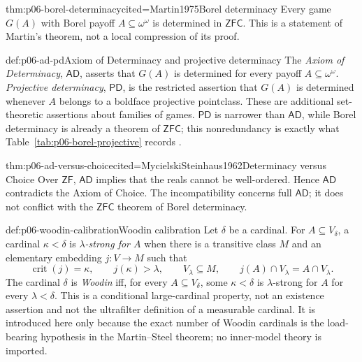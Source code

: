 \begin{hbtheorem}{thm:p06-borel-determinacy}{cited=Martin1975}{Borel determinacy}
Every game \(G(A)\) with Borel payoff
\(A\subseteq\omega^\omega\) is determined in \(\mathsf{ZFC}\).  This is a
statement of Martin's theorem, not a local compression of its proof.
\end{hbtheorem}

\begin{hbdefinition}{def:p06-ad-pd}{Axiom of Determinacy and projective determinacy}
The \emph{Axiom of Determinacy}, \(\mathsf{AD}\), asserts that \(G(A)\) is
determined for every payoff \(A\subseteq\omega^\omega\).  \emph{Projective
determinacy}, \(\mathsf{PD}\), is the restricted assertion that \(G(A)\) is
determined whenever \(A\) belongs to a boldface projective pointclass.
These are additional set-theoretic assertions about families of games.
\(\mathsf{PD}\) is narrower than \(\mathsf{AD}\), while Borel determinacy is
already a theorem of \(\mathsf{ZFC}\); this nonredundancy is exactly what
Table~\ref{tab:p06-borel-projective} records
\cite[Section~38]{Kechris1995}.
\end{hbdefinition}

\begin{hbtheorem}{thm:p06-ad-versus-choice}{cited=MycielskiSteinhaus1962}{Determinacy versus Choice}
Over \(\mathsf{ZF}\), \(\mathsf{AD}\) implies that the reals cannot be
well-ordered.  Hence \(\mathsf{AD}\) contradicts the Axiom of Choice.  The
incompatibility concerns full \(\mathsf{AD}\); it does not conflict with the
\(\mathsf{ZFC}\) theorem of Borel determinacy.
\end{hbtheorem}

\begin{hbdefinition}{def:p06-woodin-calibration}{Woodin calibration}
Let \(\delta\) be a cardinal.  For \(A\subseteq V_\delta\), a cardinal
\(\kappa<\delta\) is \emph{\(\lambda\)-strong for \(A\)} when there is a
transitive class \(M\) and an elementary embedding \(j:V\to M\) such that
\[
  \operatorname{crit}(j)=\kappa,
  \qquad j(\kappa)>\lambda,
  \qquad V_\lambda\subseteq M,
  \qquad j(A)\cap V_\lambda=A\cap V_\lambda.
\]
The cardinal \(\delta\) is \emph{Woodin} iff, for every
\(A\subseteq V_\delta\), some \(\kappa<\delta\) is
\(\lambda\)-strong for \(A\) for every \(\lambda<\delta\).  This is a
conditional large-cardinal property, not an existence assertion and not the
ultrafilter definition of a measurable cardinal.  It is introduced here only
because the exact number of Woodin cardinals is the load-bearing hypothesis in
the Martin--Steel theorem; no inner-model theory is imported.
\end{hbdefinition}

